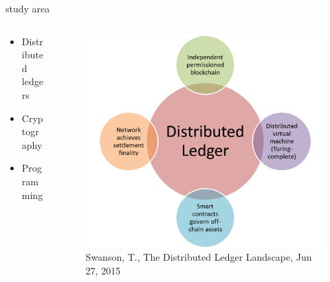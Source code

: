 \documentclass[xcolor=x11names,compress]{beamer}
\renewcommand{\(}{\begin{columns}}
\renewcommand{\)}{\end{columns}}
\newcommand{\<}[1]{\begin{column}{#1}}
\renewcommand{\>}{\end{column}}
\begin{document}
\begin{frame}{study area}
    \(
        \begin{column}{0.5\textwidth}
    \begin{itemize}
        \item Distributed ledgers
        \item Cryptography
       \item \small Programming
    \end{itemize}
    \end{column}
        \begin{column}{0.5\textwidth}
            \begin{figure}
                \includegraphics[scale=0.35]{./images/dlt}
                \caption{\tiny Swanson, T., The Distributed Ledger Landscape, Jun 27, 2015}
            \end{figure}
        \end{column}
    \)
\end{frame}


\end{document}
